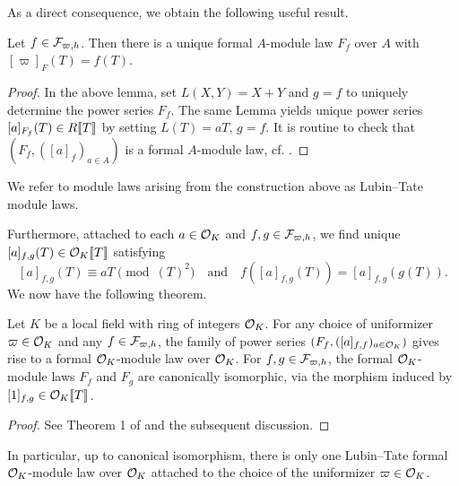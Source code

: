 \documentclass[../main.tex]{subfiles}
\begin{document}
As a direct consequence, we obtain the following useful result.
\begin{lem}
  Let $f \in \mathcal{F}_{\varpi, h}$. Then there is a unique formal $A$-module law $F_f$ over $A$
  with $[\varpi]_F(T) = f(T)$.
\begin{proof}
  In the above lemma, set $L(X,Y) = X+Y$ and $g=f$ to uniquely determine 
  the power series $F_f$. The same Lemma yields unique power series
  $[a]_{F_f}(T) \in R\llbracket T \rrbracket$ by setting $L(T) = a T$, $g=f$. It is
  routine to check that $(F_f, ([a]_f)_{a \in A})$ is a formal $A$-module law, 
  cf. \cite{LubinTateFormalMult}.
\end{proof}
\end{lem}

\begin{defi}
  We refer to module laws arising from the construction above as Lubin--Tate module laws.
\end{defi}

Furthermore, attached to each $a \in \mathcal{O}_K$ and $f,g \in \mathcal{F}_{\varpi,h}$, we find
unique $[a]_{f,g}(T) \in \mathcal{O}_K\llbracket T \rrbracket$ satisfying
\begin{equation}\label{eq:LTMoLaScaCond}
  [a]_{f,g}(T) \equiv aT \pmod {(T)^2} \quad \text{and} \quad
  f([a]_{f,g}(T)) = [a]_{f,g}(g(T)).
\end{equation}
We now have the following theorem.
\begin{thm}\label{thm:LTModLaw}
  Let $K$ be a local field with ring of integers $\mathcal{O}_K$. For any choice of 
  uniformizer $\varpi \in \mathcal{O}_K$ and any $f \in \mathcal{F}_{\varpi,h}$, the family of power
  series $(F_f, ([a]_{f,f})_{a \in \mathcal{O}_K})$
  gives rise to a formal $\mathcal{O}_K$-module law over $\mathcal{O}_K$. For 
  $f,g \in \mathcal{F}_{\varpi,h}$, the formal $\mathcal{O}_K$-module laws $F_f$ and $F_g$ are
  canonically isomorphic, via the morphism induced by $[1]_{f,g} \in \mathcal{O}_K\llbracket
  T \rrbracket$. 
\begin{proof}
  See Theorem 1 of \cite{LubinTateFormalMult} and the subsequent discussion.
\end{proof}
\end{thm}
In particular, up to canonical isomorphism, there is only one Lubin--Tate formal
$\mathcal{O}_K$-module law over $\mathcal{O}_K$ attached to the choice of the uniformizer $\varpi \in
\mathcal{O}_K$. 
\end{document}

